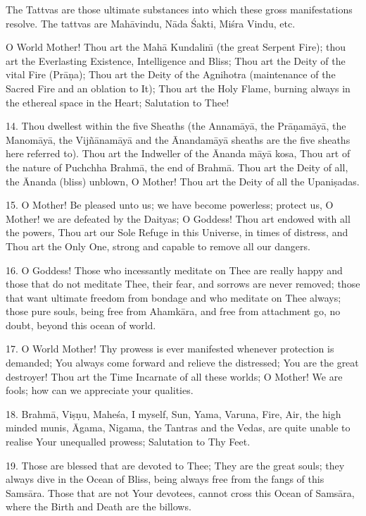 The Tattvas are those ultimate substances into which these gross manifestations resolve. The tattvas are Mah\=avindu, N\=ada \'Sakti, Mi\'sra Vindu, etc.

O World Mother! Thou art the Mah\=a Kundalin\={\i} (the great Serpent Fire); thou art the Everlasting Existence, Intelligence and Bliss; Thou art the Deity of the vital Fire (Pr\=a\d{n}a); Thou art the Deity of the Agnihotra (maintenance of the Sacred Fire and an oblation to It); Thou art the Holy Flame, burning always in the ethereal space in the Heart; Salutation to Thee!

14. Thou dwellest within the five Sheaths (the Annam\=ay\=a, the Pr\=a\d{n}am\=ay\=a, the Manom\=ay\=a, the Vij\~n\=anam\=ay\=a and the \=Anandam\=ay\=a sheaths are the five sheaths here referred to). Thou art the Indweller of the \=Ananda m\=ay\=a kosa, Thou art of the nature of Puchchha Brahm\=a, the end of Brahm\=a. Thou art the Deity of all, the \=Ananda (bliss) unblown, O Mother! Thou art the Deity of all the Upani\d{s}adas.

15. O Mother! Be pleased unto us; we have become powerless; protect us, O Mother! we are defeated by the Daityas; O Goddess! Thou art endowed with all the powers, Thou art our Sole Refuge in this Universe, in times of distress, and Thou art the Only One, strong and capable to remove all our dangers.

16. O Goddess! Those who incessantly meditate on Thee are really happy and those that do not meditate Thee, their fear, and sorrows are never removed; those that want ultimate freedom from bondage and who meditate on Thee always; those pure souls, being free from Ahamk\=ara, and free from attachment go, no doubt, beyond this ocean of world.

17. O World Mother! Thy prowess is ever manifested whenever protection is demanded; You always come forward and relieve the distressed; You are the great destroyer! Thou art the Time Incarnate of all these worlds; O Mother! We are fools; how can we appreciate your qualities.

18. Brahm\=a, Vi\d{s}\d{n}u, Mahe\'sa, I myself, Sun, Yama, Varuna, Fire, Air, the high minded munis, \=Agama, Nigama, the Tantras and the Vedas, are quite unable to realise Your unequalled prowess; Salutation to Thy Feet.

19. Those are blessed that are devoted to Thee; They are the great souls; they always dive in the Ocean of Bliss, being always free from the fangs of this Sams\=ara. Those that are not Your devotees, cannot cross this Ocean of Sams\=ara, where the Birth and Death are the billows.

